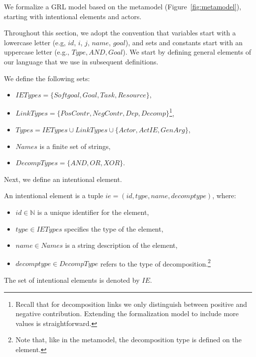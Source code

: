 We formalize a GRL model based on the metamodel (Figure~\ref{fig:metamodel}), starting with intentional elements and actors.

Throughout this section, we adopt the convention that variables start with a lowercase letter (e.g, $id$, $i$, $j$, $name$, $goal$), and sets and constants start with an uppercase letter (e.g., $Type, AND, Goal$). We start by defining general elements of our language that we use in subsequent definitions.

\begin{definition}
\label{def:set-definitions}
We define the following sets:
\begin{itemize}
\item $IETypes = \{Softgoal, Goal, Task, Resource\}$,
\item $LinkTypes = \{PosContr, NegContr, Dep, Decomp\}$\footnote{Recall that for decomposition links we only distinguish between positive and negative contribution. Extending the formalization model to include more values is straightforward.},
\item $Types = IETypes \cup LinkTypes\cup\{Actor, ActIE, GenArg\}$,
\item $Names$ is a finite set of strings,
\item $DecompTypes = \{AND,OR,XOR\}$.
\end{itemize}
\end{definition}
Next, we define an intentional element.

\begin{definition}
\label{def:ie}
An intentional element is a tuple $ie = (id, type, name, decomptype)$, where:
\begin{itemize}
\item $id\in \mathbb{N}$ is a unique identifier for the element,
\item $type\in IETypes$ specifies the type of the element,
\item $name \in Names$ is a string description of the element,
\item $decomptype\in DecompType$ refers to the type of decomposition.\footnote{Note that, like in the metamodel, the decomposition type is defined on the element.}
\end{itemize}
The set of intentional elements is denoted by $IE$.
\end{definition}

